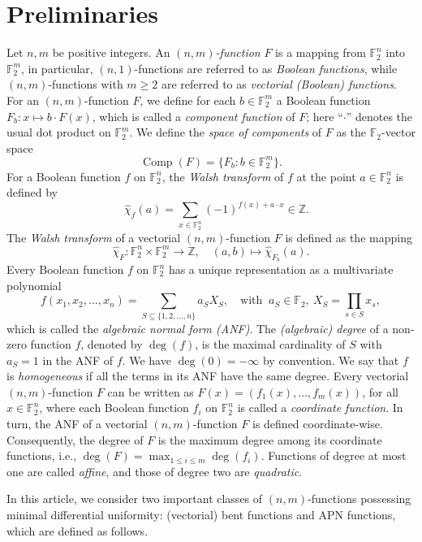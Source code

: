 \documentclass{amsart}[11pt]
\theoremstyle{plain}
\theoremstyle{definition}
\numberwithin{theorem}{section}
\numberwithin{equation}{section}
\numberwithin{table}{section}
\numberwithin{figure}{section}
\numberwithin{algorithm}{section}
\def\F{\mathbb F}
\def\Z{\mathbb Z}
\def\fd{{\mathbb F}_2}
\begin{document}
\section{Preliminaries}\label{sec:preliminaries}
Let $n,m$ be positive integers. An \emph{$(n,m)$-function} $F$ is a mapping from $\mathbb{F}_2^n$ into $\mathbb{F}_2^m$, in particular, $(n,1)$-functions are referred to as \emph{Boolean functions}, while $(n,m)$-functions with $m\ge2$ are referred to as \emph{vectorial (Boolean) functions}. For an $(n,m)$-function $F$, we define for each $b \in \mathbb{F}_2^m$ a Boolean function $F_b \colon x \mapsto  b \cdot F(x)$, which is called a \emph{component function} of $F$; here ``$\cdot$'' denotes the usual dot product on $\mathbb{F}_2^m$. We define the \emph{space of components} of $F$ as the $\mathbb{F}_2$-vector space $$\operatorname{Comp}(F) = \{ F_b \colon b \in \mathbb{F}_2^m \}.$$
For a Boolean function $f$ on $\F_2^n$, the \emph{Walsh transform} of $f$ at the point $a\in\F_2^n$ is defined by 
$$\quad\hat{\chi}_{f}(a)=\sum_{x\in\F_2^n} (-1)^{f(x)+ a\cdot x} \in \Z.$$
The \emph{Walsh transform} of a vectorial $(n,m)$-function $F$ is defined as the mapping \[\hat{\chi}_{F}\colon \F_2^n\times\F_2^m\rightarrow \Z,\quad (a,b) \mapsto \hat{\chi}_{F_b}(a).\] Every Boolean  function $f$ on $\F_2^n$ has a unique representation as a multivariate polynomial
\begin{equation*}\label{ANF}
	f(x_1, x_2, \ldots, x_n ) = \sum_{S\subseteq \{1,2,\ldots, n\}} a_S X_S,
	\quad  \text{with } \ a_S\in\fd, \ X_S = \prod_{s\in S} x_s,
\end{equation*}
which is called the \emph{algebraic normal form (ANF)}. The \emph{(algebraic) degree} of a non-zero function $f$, denoted by $\deg(f)$, is the maximal cardinality of $S$ with  $a_S=1$ in the ANF of $f$. We have $\deg(0) = - \infty$ by convention. We say that $f$ is \emph{homogeneous} if all the terms in its ANF have the same degree. Every vectorial $(n,m)$-function $F$ can be written as $F(x) = (f_1(x), \dots, f_m(x))$, for all $x\in\F_2^n$, where each Boolean function $f_i$ on $\F_2^n$ is called a \emph{coordinate function}. In turn, the ANF of a vectorial $(n,m)$-function $F$ is defined coordinate-wise. Consequently, the degree of $F$ is the maximum degree among its coordinate functions, i.e., $\deg(F)=\max_{1\le i\le m} \deg(f_i)$. Functions of degree at most one are called \emph{affine}, and those of degree two are \emph{quadratic}.

In this article, we consider two important classes of $(n,m)$-functions possessing minimal differential uniformity: (vectorial) bent functions and APN functions, which are defined as follows.
\end{document}
